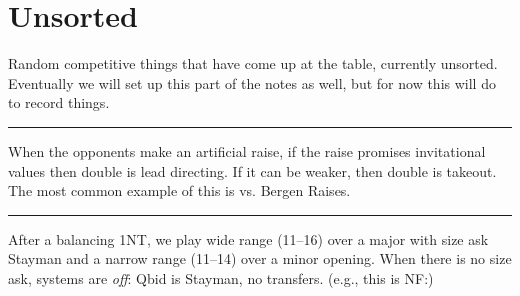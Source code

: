 \documentclass[tom-ari]{subfile}
\begin{document}
	
	\chapter{Unsorted}
	
	Random competitive things that have come up at the table, currently unsorted. Eventually we will set up this part of the notes as well, but for now this will do to record things.
	


	\hrule
	
	When the opponents make an artificial raise, if the raise promises invitational values then double is lead directing. If it can be weaker, then double is takeout. The most common example of this is vs. Bergen Raises.
	
	\hrule
	
	After a balancing 1NT, we play wide range (11--16) over a major with size ask Stayman and a narrow range (11--14) over a minor opening. When there is no size ask, systems are \textit{off}: Qbid is Stayman, no transfers. (e.g., this is NF:) 
\end{document}
